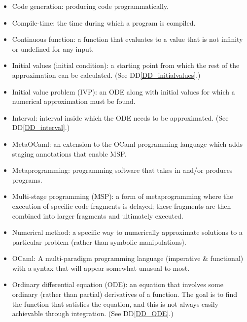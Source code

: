 \documentclass[12pt]{article}
\newcommand{\ddref}[1]{DD\ref{#1}}
\begin{document}
\begin{itemize}

\item Code generation: producing code programmatically.

\item Compile-time: the time during which a program is compiled.

\item Continuous function: a function that evaluates to a value that is not 
infinity or undefined for any input.

\item Initial values (initial condition): a starting point from which the rest 
of the approximation 
can be calculated. (See \ddref{DD_initialvalues}.)

\item Initial value problem (IVP): an ODE along with initial values for which a 
numerical approximation must be found.

\item Interval: interval inside which the ODE needs to be approximated. (See 
\ddref{DD_interval}.)

\item MetaOCaml: an extension to the OCaml programming language which adds 
staging annotations that enable MSP.

\item Metaprogramming: programming software that takes in and/or produces 
programs.

\item Multi-stage programming (MSP): a form of metaprogramming where the 
execution of specific code fragments is delayed; these fragments are then 
combined into larger fragments and ultimately executed.

\item Numerical method: a specific way to numerically approximate solutions to 
a particular problem (rather than symbolic manipulations).

\item OCaml: A multi-paradigm programming language (imperative \& functional) 
with a syntax that will appear somewhat unusual to most.

\item Ordinary differential equation (ODE): an equation that involves some 
ordinary (rather than partial) derivatives of a function. The goal is to find 
the function that satisfies the equation, and this is not always easily 
achievable through integration. (See \ddref{DD_ODE}.)


\end{itemize}
\end{document}

